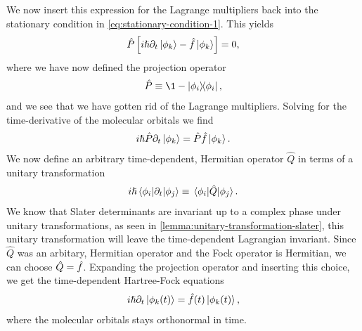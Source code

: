     We now insert this expression for the Lagrange multipliers back into the
    stationary condition in \autoref{eq:stationary-condition-1}.
    This yields
    \begin{align}
        \hat{P}\left[ 
            i\hslash\partial_t\ket*{\phi_k}
            - \hat{f}\ket*{\phi_k}
         \right]
        = 0,
    \end{align}
    where we have now defined the projection operator
    \begin{align}
        \hat{P} \equiv \1 - \dyad{\phi_i}{\phi_i},
    \end{align}
    and we see that we have gotten rid of the Lagrange multipliers.
    Solving for the time-derivative of the molecular orbitals we find
    \begin{align}
        i\hslash\hat{P}\partial_t\ket*{\phi_k}
        = \hat{P}\hat{f}\ket*{\phi_k}.
    \end{align}
    We now define an arbitrary time-dependent, Hermitian operator $\hat{Q}$
    in terms of a unitary transformation \cite{hochstuhl2014time}
    \begin{align}
        i\hslash\mel*{\phi_i}{\partial_t}{\phi_j}
        \equiv
        \mel*{\phi_i}{\hat{Q}}{\phi_j}.
    \end{align}
    We know that  Slater determinants are invariant up to a complex phase under
    unitary transformations, as seen in
    \autoref{lemma:unitary-transformation-slater}, this unitary transformation
    will leave the time-dependent Lagrangian invariant.
    Since $\hat{Q}$ was an arbitary, Hermitian operator and the Fock operator is
    Hermitian, we can choose $\hat{Q} = \hat{f}$.
    Expanding the projection operator and inserting this choice, we get the
    time-dependent Hartree-Fock equations
    \begin{align}
        i\hslash\partial_t\ket*{\phi_k(t)}
        = \hat{f}(t)\ket*{\phi_k(t)},
        \label{eq:tdhf}
    \end{align}
    where the molecular orbitals stays orthonormal in time.


\clearemptydoublepage
